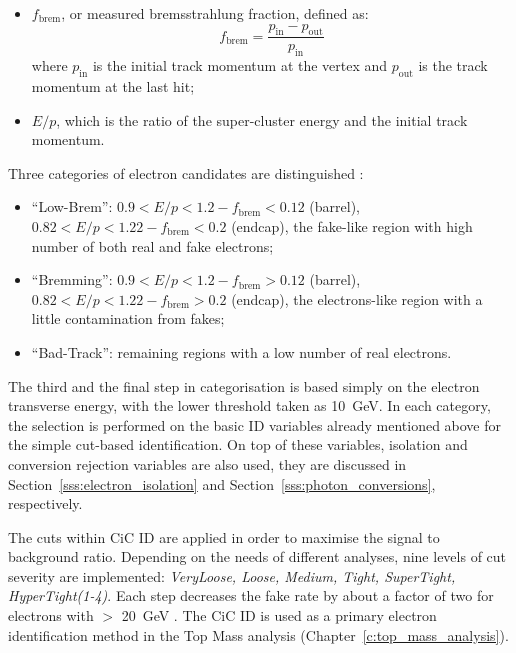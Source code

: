 \begin{itemize}
  \item $f_\text{brem}$, or measured bremsstrahlung fraction, defined as:
  \begin{equation}
  \label{eq:fbrem}
    f_\text{brem} = \frac{p_\text{in}-p_\text{out}}{p_\text{in}}
  \end{equation}
  where $p_\text{in}$ is the initial track momentum at the vertex and $p_\text{out}$ is the track momentum at the last
  hit;
  \item $E/p$, which is the ratio of the super-cluster energy and the initial track momentum.
\end{itemize}

Three categories of electron candidates are distinguished \cite{CiC_ID}:
\begin{itemize}
  \item ``Low-Brem'': $0.9 < E/p < 1.2 - f_\text{brem} < 0.12$ (barrel), $0.82 < E/p < 1.22 - f_\text{brem} < 0.2$
  (endcap), the fake-like region with high number of both real and fake electrons;
  \item ``Bremming'': $0.9 < E/p < 1.2 - f_\text{brem} > 0.12$ (barrel), $0.82 < E/p < 1.22 - f_\text{brem} > 0.2$
  (endcap), the electrons-like region with a little contamination from fakes;
  \item ``Bad-Track'': remaining regions with a low number of real electrons.
\end{itemize}

The third and the final step in categorisation is based simply on the electron transverse energy, with the lower
threshold taken as \SI{10}{\GeV}. In each category, the selection is performed on the basic ID variables already
mentioned above for the simple cut-based identification. On top of these variables, isolation and conversion rejection
variables are also used, they are discussed in Section~\ref{sss:electron_isolation} and
Section~\ref{sss:photon_conversions}, respectively.

The cuts within CiC ID are applied in order to maximise the signal to background ratio. Depending on the needs of
different analyses, nine levels of cut severity are implemented: \textit{VeryLoose, Loose, Medium, Tight, SuperTight,
HyperTight(1-4)}. Each step decreases the fake rate by about a factor of two for electrons with \ET$>$ \SI{20}{\GeV}
\cite{CiC_ID}. The CiC ID is used as a primary electron identification method in the Top Mass analysis
(Chapter~\ref{c:top_mass_analysis}).

